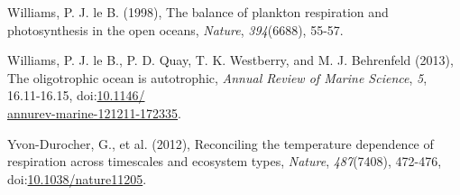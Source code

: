 \begin{singlespace}
{{Williams, P. J. le B. (1998), The balance of plankton respiration and photosynthesis in the open oceans, \emph{Nature}, \emph{394}(6688), 55-57.

Williams, P. J. le B., P. D. Quay, T. K. Westberry, and M. J. Behrenfeld (2013), The oligotrophic ocean is autotrophic, \emph{Annual Review of Marine Science}, \emph{5}, 16.11-16.15, doi:\href{http://dx.doi.org/10.1146/annurev-marine-121211-172335}{10.1146/\\annurev-marine-121211-172335}.

Yvon-Durocher, G., et al. (2012), Reconciling the temperature dependence of respiration across timescales and ecosystem types, \emph{Nature}, \emph{487}(7408), 472-476, doi:\href{http://dx.doi.org/10.1038/nature11205}{10.1038/nature11205}.}}
\end{singlespace}

\clearpage

